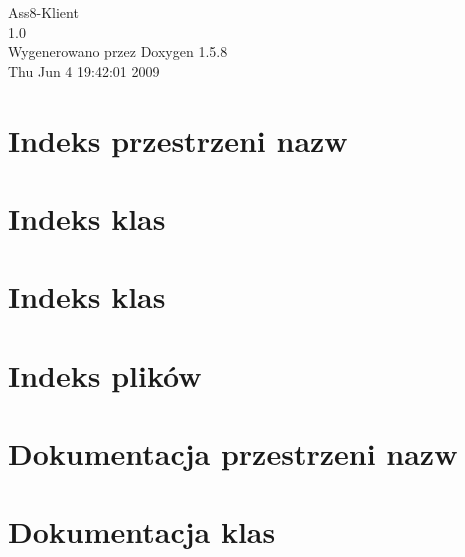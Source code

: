 \documentclass[a4paper]{book}
\begin{document}
\begin{titlepage}
\vspace*{7cm}
\begin{center}
{\Large Ass8-Klient \\[1ex]\large 1.0 }\\
\vspace*{1cm}
{\large Wygenerowano przez Doxygen 1.5.8}\\
\vspace*{0.5cm}
{\small Thu Jun 4 19:42:01 2009}\\
\end{center}
\end{titlepage}
\clearemptydoublepage
{}
\tableofcontents
\clearemptydoublepage
{}
\chapter{Indeks przestrzeni nazw}

\chapter{Indeks klas}

\chapter{Indeks klas}

\chapter{Indeks plików}

\chapter{Dokumentacja przestrzeni nazw}



\chapter{Dokumentacja klas}





































\end{document}
